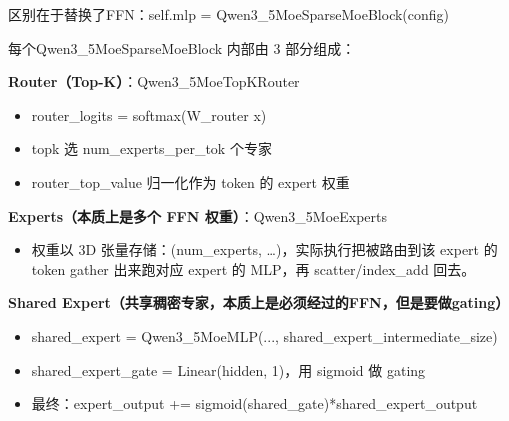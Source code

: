 \documentclass[zihao=false,fontset=windows]{ctexart}
\newcommand{\incode}[1]{\colorbox{inlinebg}{\ttfamily\small #1}}
\begin{document}
区别在于替换了FFN：\incode{self.mlp = Qwen3\_5MoeSparseMoeBlock(config)}\par

每个\incode{Qwen3\_5MoeSparseMoeBlock} 内部由 3 部分组成：\par

\textbf{Router（Top-K）}：\incode{Qwen3\_5MoeTopKRouter}\par
\begin{itemize}[label=\textcolor{feishuBlue}{\textbullet}]
\item \incode{router\_logits = softmax(W\_router x)}

\end{itemize}

\begin{itemize}[label=\textcolor{feishuBlue}{\textbullet}]
\item \incode{topk} 选 \incode{num\_experts\_per\_tok} 个专家

\end{itemize}

\begin{itemize}[label=\textcolor{feishuBlue}{\textbullet}]
\item \incode{router\_top\_value} 归一化作为 token 的 expert 权重

\end{itemize}


\Needspace{3cm}
\textbf{Experts（本质上是多个 FFN 权重）}：\incode{Qwen3\_5MoeExperts}\par
\begin{itemize}[label=\textcolor{feishuBlue}{\textbullet}]
\item 权重以 3D 张量存储：\incode{(num\_experts, …)}，实际执行把被路由到该 expert 的 token gather 出来跑对应 expert 的 MLP，再 scatter/index\_add 回去。

\end{itemize}


\Needspace{3cm}
\textbf{Shared Expert（共享稠密专家，本质上是必须经过的FFN，}\textcolor{feishuRed}{\textbf{但是要做gating}}\textbf{）}\par
\begin{itemize}[label=\textcolor{feishuBlue}{\textbullet}]
\item \incode{shared\_expert = Qwen3\_5MoeMLP(..., shared\_expert\_intermediate\_size)}

\end{itemize}

\begin{itemize}[label=\textcolor{feishuBlue}{\textbullet}]
\item \incode{shared\_expert\_gate = Linear(hidden, 1)}，用 \incode{sigmoid} 做 gating

\end{itemize}

\begin{itemize}[label=\textcolor{feishuBlue}{\textbullet}]
\item 最终：\incode{expert\_output += sigmoid(shared\_gate)*shared\_expert\_output}

\end{itemize}
\end{document}
